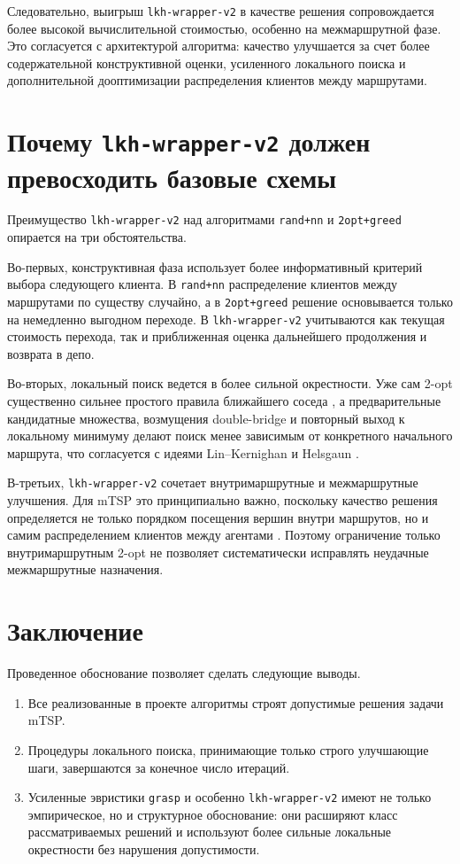 \documentclass[a4paper,12pt]{article}
\begin{document}
Следовательно, выигрыш \texttt{lkh-wrapper-v2} в качестве решения сопровождается более
высокой вычислительной стоимостью, особенно на межмаршрутной фазе. Это согласуется с
архитектурой алгоритма: качество улучшается за счет более содержательной конструктивной
оценки, усиленного локального поиска и дополнительной дооптимизации распределения клиентов
между маршрутами.

\section{Почему \texttt{lkh-wrapper-v2} должен превосходить базовые схемы}

Преимущество \texttt{lkh-wrapper-v2} над алгоритмами \texttt{rand+nn} и
\texttt{2opt+greed} опирается на три обстоятельства.

Во-первых, конструктивная фаза использует более информативный критерий выбора следующего
клиента. В \texttt{rand+nn} распределение клиентов между маршрутами по существу случайно, а
в \texttt{2opt+greed} решение основывается только на немедленно выгодном переходе. В
\texttt{lkh-wrapper-v2} учитываются как текущая стоимость перехода, так и приближенная
оценка дальнейшего продолжения и возврата в депо.

Во-вторых, локальный поиск ведется в более сильной окрестности. Уже сам 2-opt существенно
сильнее простого правила ближайшего соседа \cite{croes1958}, а предварительные кандидатные
множества, возмущения double-bridge и повторный выход к локальному минимуму делают поиск менее
зависимым от конкретного начального маршрута, что согласуется с идеями Lin--Kernighan и
Helsgaun \cite{lin1973,helsgaun2000}.

В-третьих, \texttt{lkh-wrapper-v2} сочетает внутримаршрутные и межмаршрутные улучшения. Для
mTSP это принципиально важно, поскольку качество решения определяется не только порядком
посещения вершин внутри маршрутов, но и самим распределением клиентов между агентами
\cite{bektas2006,russell1977}. Поэтому ограничение только внутримаршрутным 2-opt не
позволяет систематически исправлять неудачные межмаршрутные назначения.

\section{Заключение}

Проведенное обоснование позволяет сделать следующие выводы.
\begin{enumerate}[label=\arabic*.]
  \item Все реализованные в проекте алгоритмы строят допустимые решения задачи mTSP.
  \item Процедуры локального поиска, принимающие только строго улучшающие шаги, завершаются
  за конечное число итераций.
  \item Усиленные эвристики \texttt{grasp} и особенно \texttt{lkh-wrapper-v2} имеют не только
  эмпирическое, но и структурное обоснование: они расширяют класс рассматриваемых решений и
  используют более сильные локальные окрестности без нарушения допустимости.
\end{enumerate}
\end{document}
